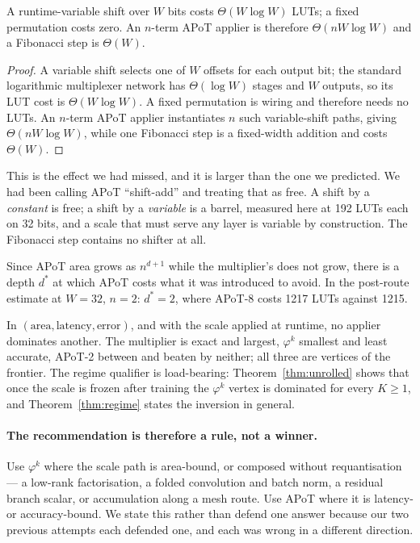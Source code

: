 \begin{theorem}
\label{thm:shifter}
A runtime-variable shift over $W$ bits costs $\Theta(W\log W)$ LUTs; a fixed
permutation costs zero. An $n$-term APoT applier is therefore
$\Theta(nW\log W)$ and a Fibonacci step is $\Theta(W)$.
\end{theorem}
\begin{proof}
A variable shift selects one of $W$ offsets for each output bit; the standard
logarithmic multiplexer network has $\Theta(\log W)$ stages and $W$ outputs,
so its LUT cost is $\Theta(W\log W)$.  A fixed permutation is wiring and
therefore needs no LUTs.  An $n$-term APoT applier instantiates $n$ such
variable-shift paths, giving $\Theta(nW\log W)$, while one Fibonacci step
is a fixed-width addition and costs $\Theta(W)$.
\end{proof}

This is the effect we had missed, and it is larger than the one we predicted. We
had been calling APoT ``shift-add'' and treating that as free. A shift by a
\emph{constant} is free; a shift by a \emph{variable} is a barrel, measured here
at 192 LUTs each on 32 bits, and a scale that must serve any layer is variable by
construction. The Fibonacci step contains no shifter at all.

\begin{corollary}
\label{cor:crossover}
Since APoT area grows as $n^{d+1}$ while the multiplier's does not grow, there is
a depth $d^{*}$ at which APoT costs what it was introduced to avoid. In the post-route estimate at
$W=32$, $n=2$: $d^{*}=2$, where APoT-8 costs 1217 LUTs against 1215.
\end{corollary}

\begin{theorem}
\label{thm:threevertex}
In $(\text{area}, \text{latency}, \text{error})$, and with the scale applied at
runtime, no applier dominates another. The multiplier is exact and largest,
$\varphi^{k}$ smallest and least accurate, APoT-2 between and beaten by neither;
all three are vertices of the frontier. The regime qualifier is load-bearing:
Theorem~\ref{thm:unrolled} shows that once the scale is frozen after training the
$\varphi^{k}$ vertex is dominated for every $K \geq 1$, and
Theorem~\ref{thm:regime} states the inversion in general.
\end{theorem}

\paragraph{The recommendation is therefore a rule, not a winner.} Use
$\varphi^{k}$ where the scale path is area-bound, or composed without
requantisation --- a low-rank factorisation, a folded convolution and batch norm,
a residual branch scalar, or accumulation along a mesh route. Use APoT where it is
latency- or accuracy-bound. We state this rather than defend one answer because
our two previous attempts each defended one, and each was wrong in a different
direction.



